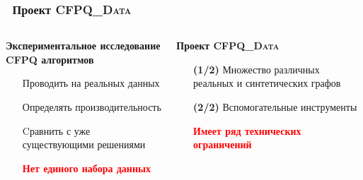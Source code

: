 \begin{frame}[fragile]
	\transwipe[direction=90]
	\frametitle{\faGithub\ Проект \textsc{CFPQ\_Data}}
	
	\begin{columns}
        \begin{column}{0.5\textwidth}
            \textbf{Экспериментальное исследование CFPQ алгоритмов}
            \begin{enumerate}
                \item[\bullet] Проводить на реальных данных
                \item[\bullet] Определять производительность
                \item[\bullet] Cравнить с уже существующими решениями
                \item[\textcolor{red}{\faWarning}] \textbf{\textcolor{red}{Нет единого набора данных}}
            \end{enumerate}
        \end{column}

        \begin{column}{0.5\textwidth}
            \textbf{Проект \textsc{CFPQ\_Data}}
            \begin{itemize} 
        	    \item[\textbf{(1/2)}] Множество различных реальных и синтетических графов
                \item[\textbf{(2/2)}] Вспомогательные инструменты
                \item[\textcolor{red}{\faWarning}] \textbf{\textcolor{red}{Имеет ряд технических ограничений}}
            \end{itemize}
        \end{column}
    \end{columns}
\end{frame}
